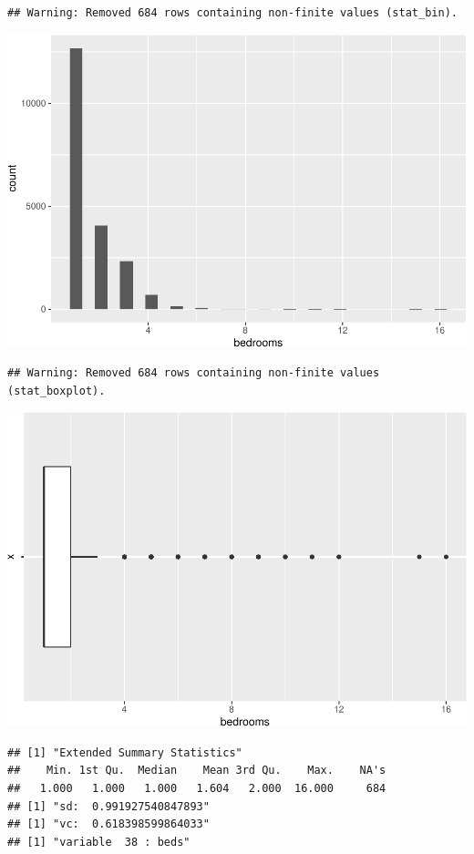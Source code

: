 \begin{verbatim}
## Warning: Removed 684 rows containing non-finite values (stat_bin).
\end{verbatim}

\includegraphics{anal_files/figure-latex/unnamed-chunk-9-18.pdf}

\begin{verbatim}
## Warning: Removed 684 rows containing non-finite values (stat_boxplot).
\end{verbatim}

\includegraphics{anal_files/figure-latex/unnamed-chunk-9-19.pdf}

\begin{verbatim}
## [1] "Extended Summary Statistics"
##    Min. 1st Qu.  Median    Mean 3rd Qu.    Max.    NA's 
##   1.000   1.000   1.000   1.604   2.000  16.000     684 
## [1] "sd:  0.991927540847893"
## [1] "vc:  0.618398599864033"
## [1] "variable  38 : beds"
\end{verbatim}

